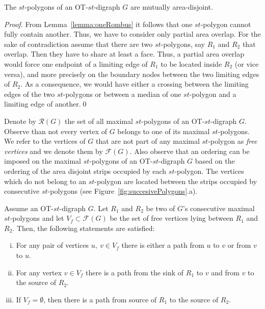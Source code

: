 \documentclass{myllncs-mixalis}
\begin{document}
\begin{lemma}
\label{lem:areaDisjointPolygons}
 The $st$-polygons of an
OT-$st$-digraph $G$ are mutually area-disjoint.
\end{lemma}
\begin{proof}
From Lemma~\ref{lemma:oneRombus} it follows that one $st$-polygon
cannot fully contain another. Thus, we have to consider only partial
area overlap. For the sake of contradiction assume that there are
two $st$-polygons, say $R_1$ and $R_2$  that overlap. Then they have
to share at least a face. Thus, a partial area overlap would force
one endpoint of a limiting edge of $R_1$ to be located inside $R_2$
(or vice versa), and more precisely on the boundary nodes between
the two limiting edges of $R_2$. As a consequence, we would have
either a crossing between the limiting edges of the two
$st$-polygons or between a median of one $st$-polygon and a limiting
edge of another.\qed
\end{proof}

Denote by $\mathcal{R}(G)$ the set of all maximal $st$-polygons of
an OT-$st$-digraph $G$.  Observe than not every vertex of $G$
belongs to one of its maximal $st$-polygons. We refer to  the
vertices of $G$ that are not part of any maximal $st$-polygon as
\emph{free vertices} and we denote them by $\mathcal{F}(G)$.
 Also observe that
an ordering can be imposed on the maximal $st$-polygons of an
OT-$st$-digraph $G$ based on the ordering of the area disjoint
strips occupied by each $st$-polygon. The vertices which do not
belong to an $st$-polygon are located between the strips occupied by
consecutive $st$-polygons (see
Figure~\ref{fig:succesivePolygons}.a).



\begin{lemma}
\label{lem:pahtProperties}
 Assume an OT-$st$-digraph $G$. Let
$R_1$ and $R_2$ be two of $G$'s consecutive maximal $st$-polygons
and let $V_f \subset \mathcal{F}(G)$ be the set of free vertices
lying between $R_1$ and $R_2$. Then, the following statements are
satisfied: \vspace*{-.5cm}
\begin{enumerate}[(i)]
\item For any pair of vertices $u,~v\in V_f$ there is either a path
from $u$ to $v$ or from $v$ to $u$.
\item For any vertex $v\in V_f$ there is a path from the sink of $R_1$
to $v$ and from $v$ to the source of $R_2$.
\item If $V_f=\emptyset$, then there is a path from source of $R_1$
to the source of $R_2$.
\end{enumerate}
\end{lemma}
\end{document}
